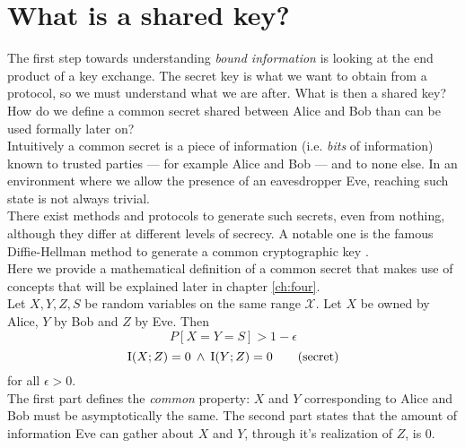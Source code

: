 \section{What is a shared key?}
	The first step towards understanding \emph{bound information} is looking at the end product of a key exchange. 
	The secret key is what we want to obtain from a protocol, so we must understand what we are after.
	What is then a shared key? 
	How do we define a common secret shared between Alice and Bob than can be used formally later on? \\
    	
Intuitively a common secret is a piece of information (i.e. \textit{bits} of information) known to trusted parties --- for example Alice and Bob --- and to none else. 
In an environment where we allow the presence of an eavesdropper Eve, reaching such state is not always trivial. \\
There exist methods and protocols to generate such secrets, even from nothing, although they differ at different levels of secrecy. A notable one is the famous Diffie-Hellman method to generate a common cryptographic key \cite{DH76} .\\
Here we provide a mathematical definition of a common secret that makes use of concepts that will be explained later in chapter \ref{ch:four}.\\
    	
	Let $X,Y,Z,S$ be random variables on the same range $\mathcal{X}$. Let $X$ be owned by Alice, $Y$ by Bob and $Z$ by Eve. Then
  \begin{equation} \label{eq:common}
	  P[X=Y=S] > 1 - \epsilon \tag{common}
	\end{equation}
	\begin{equation} \label{eq:secret}
	  \operatorname{I}(X;Z) = 0 \: \wedge \: \operatorname{I}(Y;Z) = 0 \tag{secret}
  \end{equation}
for all $\epsilon > 0 $. \\
The first part defines the \textit{common} property: $X$ and $Y$ corresponding to Alice and Bob must be asymptotically the same. 
The second part states that the amount of information Eve can gather about $X$ and $Y$, through it's realization of $Z$, is $0$.
